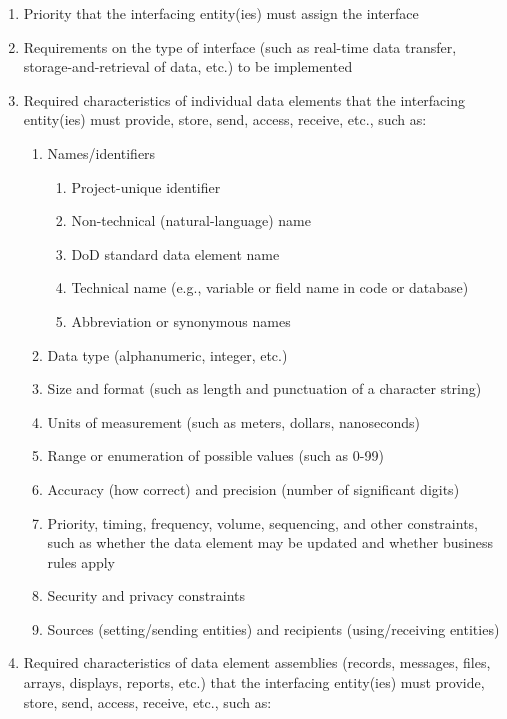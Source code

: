 \begin{enumerate}
\itemsep1pt\parskip0pt
\item
  Priority that the interfacing entity(ies) must assign the interface
\item
  Requirements on the type of interface (such as real-time data
  transfer, storage-and-retrieval of data, etc.) to be implemented
\item
  Required characteristics of individual data elements that the
  interfacing entity(ies) must provide, store, send, access, receive,
  etc., such as:

  \begin{enumerate}
  \itemsep1pt\parskip0pt
  \item
    Names/identifiers

    \begin{enumerate}
    \itemsep1pt\parskip0pt
    \item
      Project-unique identifier
    \item
      Non-technical (natural-language) name
    \item
      DoD standard data element name
    \item
      Technical name (e.g., variable or field name in code or database)
    \item
      Abbreviation or synonymous names
    \end{enumerate}
  \item
    Data type (alphanumeric, integer, etc.)
  \item
    Size and format (such as length and punctuation of a character
    string)
  \item
    Units of measurement (such as meters, dollars, nanoseconds)
  \item
    Range or enumeration of possible values (such as 0-99)
  \item
    Accuracy (how correct) and precision (number of significant digits)
  \item
    Priority, timing, frequency, volume, sequencing, and other
    constraints, such as whether the data element may be updated and
    whether business rules apply
  \item
    Security and privacy constraints
  \item
    Sources (setting/sending entities) and recipients (using/receiving
    entities)
  \end{enumerate}
\item
  Required characteristics of data element assemblies (records,
  messages, files, arrays, displays, reports, etc.) that the interfacing
  entity(ies) must provide, store, send, access, receive, etc., such as:


\end{enumerate}
